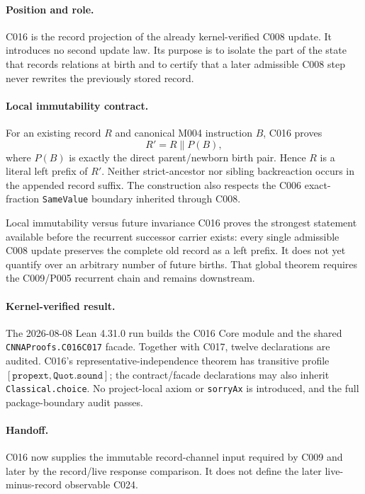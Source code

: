 
\paragraph*{Position and role.}
C016 is the record projection of the already kernel-verified C008 update.  It
introduces no second update law.  Its purpose is to isolate the part of the
state that records relations at birth and to certify that a later admissible
C008 step never rewrites the previously stored record.

\paragraph*{Local immutability contract.}
For an existing record $R$ and canonical M004 instruction $B$, C016 proves
\[
  R' = R\mathbin{\|}P(B),
\]
where $P(B)$ is exactly the direct parent/newborn birth pair.  Hence $R$ is a
literal left prefix of $R'$.  Neither strict-ancestor nor sibling backreaction
occurs in the appended record suffix.  The construction also respects the C006
exact-fraction \texttt{SameValue} boundary inherited through C008.

\begin{cnnaInfoBox}{Local immutability versus future invariance}
C016 proves the strongest statement available before the recurrent successor
carrier exists: every single admissible C008 update preserves the complete old
record as a left prefix.  It does not yet quantify over an arbitrary number of
future births.  That global theorem requires the C009/P005 recurrent chain and
remains downstream.
\end{cnnaInfoBox}

\paragraph*{Kernel-verified result.}
The 2026-08-08 Lean 4.31.0 run builds the C016 Core module and the shared
\texttt{CNNAProofs.C016C017} facade.  Together with C017, twelve declarations
are audited.  C016's representative-independence theorem has transitive profile
$[\texttt{propext},\texttt{Quot.sound}]$; the contract/facade declarations may
also inherit \texttt{Classical.choice}.  No project-local axiom or
\texttt{sorryAx} is introduced, and the full package-boundary audit passes.

\paragraph*{Handoff.}
C016 now supplies the immutable record-channel input required by C009 and later
by the record/live response comparison.  It does not define the later
live-minus-record observable C024.
